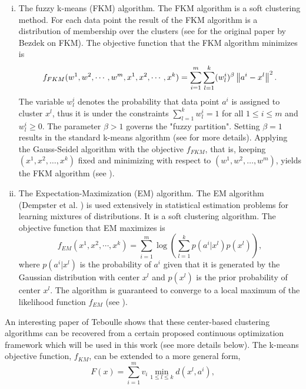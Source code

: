 \begin{enumerate}[(i)]
	\item The fuzzy k-means (FKM) algorithm. The FKM algorithm is a soft clustering method. For each data point the result of the FKM algorithm is a distribution of membership over the clusters (see \cite{B1981} for the original paper by Bezdek on FKM). The objective function that the FKM algorithm minimizes is
	\begin{equation*}
		f_{FKM}(w^1,w^2,\cdots,w^m,x^1,x^2,\cdots,x^k) = \sum\limits_{i=1}^{m}\sum\limits_{l=1}^{k}(w^i_l)^\beta \left\Vert {a^i-x^l} \right\Vert^2.
	\end{equation*}
	The variable $w^i_l$ denotes the probability that data point $a^i$ is assigned to cluster $x^l$, thus it is under the constraints $\sum_{l=1}^{k} w^i_l = 1$ for all $1 \leq i \leq m$ and $w^i_l \geq 0$. The parameter $\beta > 1$ governs the "fuzzy partition". Setting $\beta = 1$ results in the standard k-means algorithm (see  for more details). Applying the Gauss-Seidel algorithm with the objective $f_{FKM}$, that is, keeping $\left(x^1,x^2,\ldots,x^k\right)$ fixed and minimizing with respect to $\left(w^1,w^2,\ldots,w^m\right)$, yields the FKM algorithm (see \cite[p. 528]{DHS2001}).
	\item The Expectation-Maximization (EM) algorithm. The EM algorithm (Dempster et al. \cite{DLR1977}) is used extensively in statistical estimation problems for learning mixtures of distributions. It is a soft clustering algorithm. The objective function that EM maximizes is 
	\begin{equation*}
		f_{EM}(x^1,x^2,\cdots,x^k) = \sum\limits_{i=1}^{m} \log \left( \sum\limits_{l=1}^{k} p\left(a^i|x^l\right) p\left(x^l\right) \right),
	\end{equation*}
	where  $p\left(a^i|x^l\right)$ is the probability of $a^i$ given that it is generated by the Gaussian distribution with center $x^l$ and $p\left(x^l\right)$ is the prior probability of center $x^l$. The algorithm is guaranteed to converge to a local maximum of the likelihood function $f_{EM}$ (see \cite{W1983}).
\end{enumerate}
An interesting paper of Teboulle \cite{T2007} shows that these center-based clustering algorithms can be recovered from a certain proposed continuous optimization framework which will be used in this work (see more details below). The k-means objective function, $f_{KM}$, can be extended to a more general form,
	\begin{equation}
		F(x)=\sum\limits_{i=1}^m v_i \min\limits_{1\leq l \leq k} d\left(x^l,a^i\right), \label{clustering_objective}
	\end{equation}
